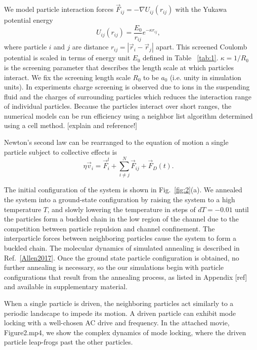 \documentclass[twocolumn,preprintnumbers,amsmath,amssymb,aps,prx]{revtex4}
\begin{document}
 We model particle interaction forces
$\vec{F}_{ij} = -\nabla U_{ij}(r_{ij})$ 
with
the Yukawa potential energy 
\begin{equation}
  U_{ij}(r_{ij}) = \frac{E_0}{r_{ij}} e^{-\kappa r_{ij}},
  \label{eq:yukawa}
\end{equation}
where particle $i$ and $j$ are distance
$r_{ij} = |\vec{r}_i - \vec{r}_j|$ apart.
This 
screened Coulomb potential
is scaled in terms of energy unit $E_0$
defined in Table ~\ref{tab:1}.
$\kappa = 1/R_0$ is the screening parameter 
that describes the length scale at
which particles interact.
We fix the screening length scale $R_0$ to be $a_0$
(i.e. unity in simulation units).
In experiments charge screening is observed
due to ions in the suspending fluid and
the charges of surrounding particles
which
reduces the interaction range of individual particles. %
Because the particles interact over short ranges, 
the numerical models can be run efficiency
using a neighbor list algorithm
determined using a cell method.
[explain and reference!]

Newton's second law can be rearranged %
to
the equation of motion a single particle subject to collective effects is 
\begin{equation}
  \eta \vec{v}_i = \vec{F}^l_{i} + \sum_{i \neq j}^{N} \vec{F}_{ij} + \vec{F}_{D}(t).
    \label{eq:motion}
\end{equation}

The initial configuration of the system is shown in 
Fig.~\ref{fig:2}(a).  
We annealed the system into a ground-state configuration
by raising the system to a high temperature $T$,
and slowly lowering the temperature in steps of $dT=-0.01$
until the particles form a buckled chain in the low region of the channel
due to the
competition between particle repulsion and channel confinement.
The interparticle forces between neighboring particles
cause the system to form a buckled chain. %
The molecular dynamics of simulated annealing
is described in Ref.~\ref{Allen2017}.
Once the ground state particle configuration is obtained,
no further annealing is necessary,
so the
our simulations begin with particle configurations
that result from the annealing process,
as listed in Appendix [ref] and available in supplementary material.

When a single particle is driven, the neighboring particles act similarly to a periodic landscape to impede its motion. A driven particle can exhibit mode locking with a well-chosen AC drive and frequency. In the attached movie, Figure2.mp4, we show the complex dynamics of mode locking, where the driven particle leap-frogs past the other particles. 
\end{document}
